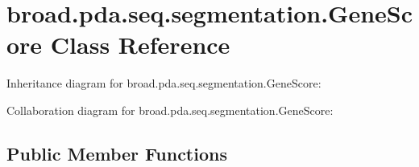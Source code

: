 \hypertarget{classbroad_1_1pda_1_1seq_1_1segmentation_1_1_gene_score}{\section{broad.\+pda.\+seq.\+segmentation.\+Gene\+Score Class Reference}
\label{classbroad_1_1pda_1_1seq_1_1segmentation_1_1_gene_score}
}


Inheritance diagram for broad.\+pda.\+seq.\+segmentation.\+Gene\+Score\+:


Collaboration diagram for broad.\+pda.\+seq.\+segmentation.\+Gene\+Score\+:
\subsection*{Public Member Functions}
